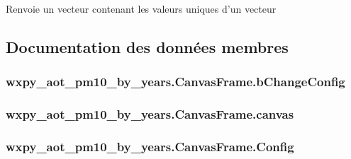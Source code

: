 \begin{DoxyVerb}Renvoie un vecteur contenant les valeurs uniques d'un vecteur  \end{DoxyVerb}
 

\subsection{Documentation des données membres}
\hypertarget{classwxpy__aot__pm10__by__years_1_1_canvas_frame_a89adfebea2e1a6f6cb558a92578b78c9}{
\subsubsection[{b\-Change\-Config}]{\setlength{\rightskip}{0pt plus 5cm}wxpy\-\_\-aot\-\_\-pm10\-\_\-by\-\_\-years.\-Canvas\-Frame.\-b\-Change\-Config}}\label{classwxpy__aot__pm10__by__years_1_1_canvas_frame_a89adfebea2e1a6f6cb558a92578b78c9}
\hypertarget{classwxpy__aot__pm10__by__years_1_1_canvas_frame_a7ed3a9acc45420fcdc01decddd24d818}{
\subsubsection[{canvas}]{\setlength{\rightskip}{0pt plus 5cm}wxpy\-\_\-aot\-\_\-pm10\-\_\-by\-\_\-years.\-Canvas\-Frame.\-canvas}}\label{classwxpy__aot__pm10__by__years_1_1_canvas_frame_a7ed3a9acc45420fcdc01decddd24d818}
\hypertarget{classwxpy__aot__pm10__by__years_1_1_canvas_frame_a60b48a121123885e55fa2398bcb26bff}{
\subsubsection[{Config}]{\setlength{\rightskip}{0pt plus 5cm}wxpy\-\_\-aot\-\_\-pm10\-\_\-by\-\_\-years.\-Canvas\-Frame.\-Config}}\label{classwxpy__aot__pm10__by__years_1_1_canvas_frame_a60b48a121123885e55fa2398bcb26bff}

